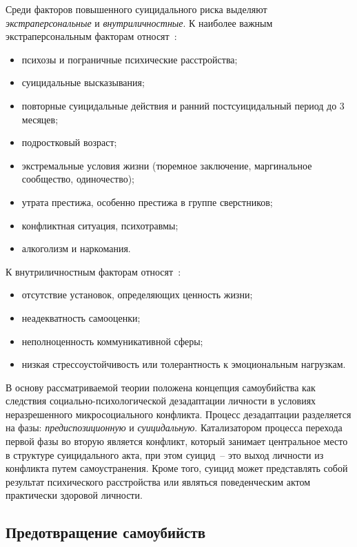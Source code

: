 Среди факторов повышенного суицидального риска выделяют \textit{экстраперсональные} и \textit{внутриличностные}. К наиболее важным экстраперсональным факторам относят~\cite{ticho}:

\begin{itemize}
	\item психозы и пограничные психические расстройства;
	\item суицидальные высказывания;
	\item повторные суицидальные действия и ранний постсуицидальный период до 3 месяцев;
	\item подростковый возраст;
	\item экстремальные условия жизни (тюремное заключение, маргинальное сообщество, одиночество);
	\item утрата престижа, особенно престижа в группе сверстников;
	\item конфликтная ситуация, психотравмы;
	\item алкоголизм и наркомания.
\end{itemize}

К внутриличностным факторам относят~\cite{ticho}:

\begin{itemize}
	\item отсутствие установок, определяющих ценность жизни;
	\item неадекватность самооценки;
	\item неполноценность коммуникативной сферы;
	\item низкая стрессоустойчивость или толерантность к эмоциональным нагрузкам.
\end{itemize}

В основу рассматриваемой теории положена концепция самоубийства как следствия социально-психологической дезадаптации личности в условиях неразрешенного микросоциального конфликта. Процесс дезадаптации разделяется на фазы: \textit{предиспозиционную} и \textit{суицидальную}. Катализатором процесса перехода первой фазы во вторую является конфликт, который занимает центральное место в структуре суицидального акта, при этом суицид~-- это выход личности из конфликта путем самоустранения. Кроме того, суицид может представлять собой результат психического расстройства или являться поведенческим актом практически здоровой личности.~\cite{starsen}


\subsection{Предотвращение самоубийств}

